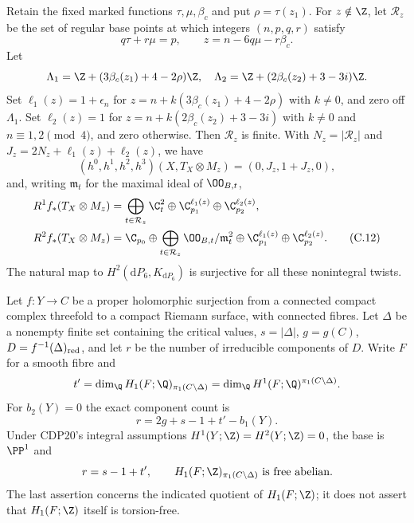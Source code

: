\begin{proposition}\label{cdp:st:C5c}

Retain the fixed marked functions $\tau,\mu,\beta_c$ and put $\rho=\tau(z_1)$. For $z\notin\Z$, let $\mathcal R_z$ be the set of regular base points at which integers $(n,p,q,r)$ satisfy
\[
 q\tau+r\mu=p,\qquad z=n-6q\mu-r\beta_c.               \tag{C.10}\label{cdp:eq:C.10}
\]
Let
\[
 \Lambda_1=\Z+(3\beta_c(z_1)+4-2\rho)\Z,\quad
 \Lambda_2=\Z+(2\beta_c(z_2)+3-3i)\Z.
\]
Set $\ell_1(z)=1+\epsilon_n$ for $z=n+k(3\beta_c(z_1)+4-2\rho)$ with $k\ne0$, and zero off $\Lambda_1$. Set $\ell_2(z)=1$ for $z=n+k(2\beta_c(z_2)+3-3i)$ with $k\ne0$ and $n\equiv1,2\pmod4$, and zero otherwise. Then $\mathcal R_z$ is finite. With $N_z=|\mathcal R_z|$ and $J_z=2N_z+\ell_1(z)+\ell_2(z)$, we have
\[
 (h^0,h^1,h^2,h^3)(X,T_X\otimes M_z)=(0,J_z,1+J_z,0),  \tag{C.11}\label{cdp:eq:C.11}
\]
and, writing $\mathfrak m_t$ for the maximal ideal of $\OO_{B,t}$,
\begin{align*}
R^1f_*(T_X\otimes M_z)&=
 \bigoplus_{t\in\mathcal R_z}\C_t^2
 \oplus\C_{p_1}^{\ell_1(z)}\oplus\C_{p_2}^{\ell_2(z)},\\
R^2f_*(T_X\otimes M_z)&=
 \C_{p_0}\oplus\bigoplus_{t\in\mathcal R_z}\OO_{B,t}/\mathfrak m_t^2
 \oplus\C_{p_1}^{\ell_1(z)}\oplus\C_{p_2}^{\ell_2(z)}.\tag{C.12}\label{cdp:eq:C.12}
\end{align*}
The natural map to $H^2(\mathrm dP_6,K_{\mathrm dP_6})$ is surjective for all these nonintegral twists.
\end{proposition}

\begin{proposition}\label{cdp:st:D.1.2}

Let $f:Y\to C$ be a proper holomorphic surjection from a connected
compact complex threefold to a compact Riemann surface, with
connected fibres. Let $\Delta$ be a nonempty finite set containing
the critical values, $s=|\Delta|$, $g=g(C)$,
$D=f^{-1}(\Delta)_{\rm red}$, and let $r$ be the number of
irreducible components of $D$. Write $F$ for a smooth fibre and
\[
t'=\dim_{\Q}H_1(F;\Q)_{\pi_1(C\setminus\Delta)}
   =\dim_{\Q}H^1(F;\Q)^{\pi_1(C\setminus\Delta)}.
\]
For $b_2(Y)=0$ the exact component count is
\[
\boxed{\quad r=2g+s-1+t'-b_1(Y).\quad}
\]
Under CDP20's integral assumptions
$H^1(Y;\Z)=H^2(Y;\Z)=0$, the base is $\PP^1$ and
\[
r=s-1+t',\qquad
H_1(F;\Z)_{\pi_1(C\setminus\Delta)}\text{ is free abelian}.
\]
The last assertion concerns the indicated quotient of $H_1(F;\Z)$;
it does not assert that $H_1(F;\Z)$ itself is torsion-free.
\end{proposition}

